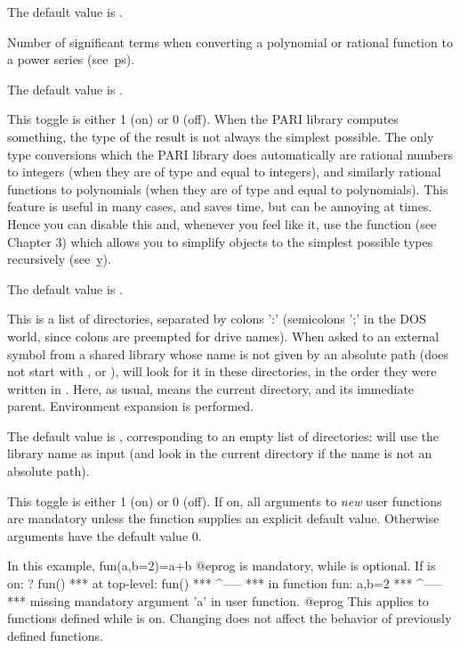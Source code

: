{The default value is .

\label{se:def,seriesprecision}
Number of significant terms
when converting a polynomial or rational function to a power series
(see~\b{ps}).

The default value is .

\label{se:def,simplify}
This toggle is either 1 (on) or 0 (off). When the PARI library computes
something, the type of the
result is not always the simplest possible. The only type conversions which
the PARI library does automatically are rational numbers to integers (when
they are of type  and equal to integers), and similarly rational
functions to polynomials (when they are of type  and equal to
polynomials). This feature is useful in many cases, and saves time, but can
be annoying at times. Hence you can disable this and, whenever you feel like
it, use the function  (see Chapter 3) which allows you to
simplify objects to the simplest possible types recursively (see~\b{y}).

The default value is .

\label{se:def,sopath}
This is a list of directories, separated by colons ':'
(semicolons ';' in the DOS world, since colons are preempted for drive names).
When asked to  an external symbol from a shared library whose
name is not given by an absolute path (does not start with \kbd{/}, 
or ),  will look for it in these directories, in the order
they were written in . Here, as usual,  means the current
directory, and  its immediate parent. Environment expansion is
performed.

The default value is , corresponding to an empty list of
directories:  will use the library name as input (and look in
the current directory if the name is not an absolute path).

\label{se:def,strictargs}
This toggle is either 1 (on) or 0 (off). If on, all arguments to \emph{new}
user functions are mandatory unless the function supplies an explicit default
value.
Otherwise arguments have the default value $0$.

In this example,
\bprog
  fun(a,b=2)=a+b
@eprog
 is mandatory, while  is optional. If  is on:
\bprog
? fun()
 ***   at top-level: fun()
 ***                 ^-----
 ***   in function fun: a,b=2
 ***                    ^-----
 ***   missing mandatory argument 'a' in user function.
@eprog
This applies to functions defined while  is on. Changing 
does not affect the behavior of previously defined functions.

}
